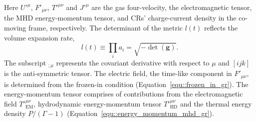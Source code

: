 \documentclass[fleqn,usenatbib]{mnras}
\begin{document}
Here $U'^\mu$, $F'_{\mu \nu}$, $T'^{\mu \nu}$ and $J'^\mu$ are the gas four-velocity, the electromagnetic tensor, the MHD energy-momentum tensor, and CRs' charge-current density in the co-moving frame, respectively. The determinant of the metric $l(t)$ reflects the volume expansion rate,
\begin{equation}
    l(t) \equiv \prod_i a_i = \sqrt{- \det (\mathbf{g})}.
\end{equation}
The subscript $_{; \mu}$ represents the covariant derivative with respect to $\mu$ and $[ijk]$ is the anti-symmetric tensor. The electric field, the time-like component in $F'_{\mu \nu}$, is determined from the frozen-in condition (Equation~\ref{equ::frozen_in_gr}). The energy-momentum tensor comprises of contributions from the electromagnetic field $T'^{\mu \nu}_\text{EM}$, hydrodynamic energy-momentum tensor $T'^{\mu \nu}_\text{HD}$ and the thermal energy density $P / \left(\Gamma - 1\right)$ (Equation~\ref{equ::energy_momentum_mhd_gr}).
\end{document}
